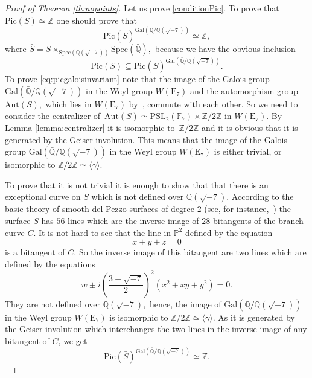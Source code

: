 \documentclass{amsart}
\numberwithin{equation}{section}
\theoremstyle{definition}
\begin{document}
\begin{proof}[Proof of Theorem \ref{th:nopoints}]
Let us prove \ref{conditionPic}. To prove that $\mathrm{Pic}(S) \simeq \mathbb{Z}$ one should prove that  
\begin{equation}\label{eq:picgaloisinvariant}
\mathrm{Pic}(\bar{S})^{\mathrm{Gal}(\bar{\mathbb{Q}}/\mathbb{Q}(\sqrt{-7}))} \simeq \mathbb{Z},
\end{equation}
\noindent where $\bar{S}=S \times_{\mathrm{Spec}(\mathbb{Q}(\sqrt{-7}))}\mathrm{Spec}(\bar{\mathbb{Q}}),$ because we have the obvious inclusion 
$$
\mathrm{Pic}(S) \subseteq \mathrm{Pic}(\bar{S})^{\mathrm{Gal}(\bar{\mathbb{Q}}/\mathbb{Q}(\sqrt{-7}))}.
$$
\noindent To prove \eqref{eq:picgaloisinvariant} note that the image of the Galois group $\mathrm{Gal}(\bar{\mathbb{Q}}/\mathbb{Q}(\sqrt{-7}))$ in the Weyl group $W(\mathrm{E}_7)$ and the automorphism group $\mathrm{Aut}(S),$ which lies in $W(\mathrm{E}_7)$ by~\cite[Corollary 8.2.40]{Dolgachev}, commute with each other. So we need to consider the centralizer of~\mbox{$\mathrm{Aut}(S) \simeq \mathrm{PSL}_2(\mathbb{F}_7) \times \mathbb{Z}/2\mathbb{Z}$} in $W(\mathrm{E}_7).$ By Lemma \ref{lemma:centralizer} it is isomorphic to~$\mathbb{Z}/2\mathbb{Z}$ and it is obvious that it is generated by the Geiser involution. This means that the image of the Galois group $\mathrm{Gal}(\bar{\mathbb{Q}}/\mathbb{Q}(\sqrt{-7}))$ in the Weyl group $W(\mathrm{E}_7)$ is either trivial, or isomorphic to $\mathbb{Z}/2\mathbb{Z} \simeq \langle \gamma \rangle.$ 

To prove that it is not trivial it is enough to show that that there is an exceptional curve on $S$ which is not defined over $\mathbb{Q}(\sqrt{-7}).$ According to the basic theory of smooth del Pezzo surfaces of degree $2$ (see, for instance,~\cite[\S 8.7.1]{Dolgachev}) the surface $S$ has $56$ lines which are the inverse image of $28$ bitangents of the branch curve $C.$ It is not hard to see that the line in $\mathbb{P}^2$ defined by the equation
$$
x+y+z=0
$$
is a bitangent of $C.$ So the inverse image of this bitangent are two lines which are defined by the equations
$$
w \pm i\left(\frac{3+\sqrt{-7}}{2} \right)^2(x^2+xy+y^2)=0.
$$
\noindent They are not defined over $\mathbb{Q}(\sqrt{-7}),$ hence, the image of  $\mathrm{Gal}(\bar{\mathbb{Q}}/\mathbb{Q}(\sqrt{-7}))$ in the Weyl group $W(\mathrm{E}_7)$ is isomorphic to $\mathbb{Z}/2\mathbb{Z} \simeq \langle \gamma \rangle.$ As it is generated by the Geiser involution which  interchanges the two lines in the inverse image of
any bitangent of $C$, we get
$$ 
\mathrm{Pic}(\bar{S})^{\mathrm{Gal}(\bar{\mathbb{Q}}/\mathbb{Q}(\sqrt{-7}))} \simeq \mathbb{Z}.
$$








\end{proof}
\end{document}
